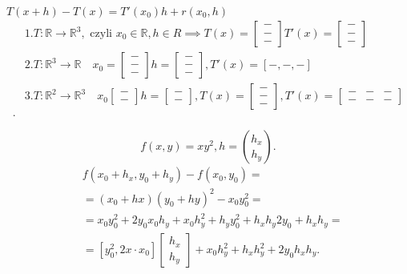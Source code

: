 \documentclass[../main.tex]{subfiles}
\begin{document}
\begin{przyklad}


   $T(x+h) - T(x) = T'(x_0)h+r(x_0,h)$
    \begin{align}
        &1. T: \mathbb{R}\to \mathbb{R}^{3}, \text{ czyli } x_0\in \mathbb{R}, h\in R \implies T(x) = \begin{bmatrix} -\\-\\- \end{bmatrix}  T'(x) = \begin{bmatrix} -\\-\\- \end{bmatrix} \\
            &2. T:\mathbb{R}^3 \to \mathbb{R} \quad x_0 = \begin{bmatrix} -\\-\\- \end{bmatrix}  h = \begin{bmatrix} -\\-\\- \end{bmatrix} , T'(x) = \left[ -,-,- \right] \\
                &3. T:\mathbb{R}^2 \to \mathbb{R}^3 \quad x_0 \begin{bmatrix} -\\- \end{bmatrix}  h = \begin{bmatrix} -\\- \end{bmatrix}, T(x) = \begin{bmatrix} -\\-\\- \end{bmatrix} , T'(x) = \begin{bmatrix} -&-&-\\-&-&- \end{bmatrix} \\
    .\end{align}
\end{przyklad}
\begin{przyklad}
    \[
        f(x,y) = xy^2, h=\binom{h_x}{h_y}.
    \]
       \begin{align*}
           &f(x_0+h_x,y_0+h_y) - f(x_0,y_0) = \\
           &= (x_0+hx)(y_0+hy)^2 - x_0y_0^2 = \\
           &= x_0y_0^2 + 2y_0x_0h_y + x_0h_y^2 + h_yy_0^2 + h_xh_y 2y_0 + h_xh_y = \\
           &= \left[ y_0^2, 2x\cdot x_0 \right] \begin{bmatrix}h_x\\h_y  \end{bmatrix} + x_0h_y^2+h_xh_y^2+2y_0h_xh_y
       .\end{align*}
\end{przyklad}
\end{document}
